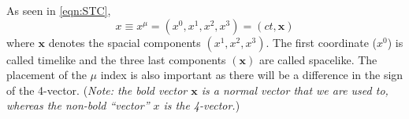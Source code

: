 As seen in \eqref{eqn:STC},
\begin{equation}
x\equiv x^\mu=(x^0,x^1,x^2,x^3)=(ct,\bm x)
\end{equation}
where $\bm x$ denotes the spacial components $(x^1,x^2,x^3)$. The first coordinate ($x^0$) is called timelike and the three last components $(\bm x)$ are called spacelike. The placement of the $\mu$ index is also important as there will be a difference in the sign of the 4-vector. (\emph{Note: the bold vector $\bm x$ is a normal vector that we are used to, whereas the non-bold “vector” $x$ is the 4-vector.})